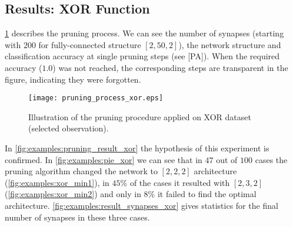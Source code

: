 \begin{table}[H]
\centering
{}
\caption{Experiment settings for XOR dataset.}
\label{tab:examples:xor_settings}
\end{table}

\subsection*{Results: XOR Function}
\cref{fig:examples:pruning_process_xor} describes the pruning process. We can see the number of synapses (starting with $ 200 $ for fully-connected structure $ [2, 50, 2] $), the network structure and classification accuracy at single pruning steps (see [PA]). When the required accuracy ($ 1.0 $) was not reached, the corresponding steps are transparent in the figure, indicating they were forgotten.

\begin{figure}[H]
\centering
\texttt{[image: pruning\_process\_xor.eps]}
\caption{Illustration of the pruning procedure applied on XOR dataset (selected observation).}
\label{fig:examples:pruning_process_xor}
\end{figure}

In \cref{fig:examples:pruning_result_xor} the hypothesis of this experiment is confirmed. In \cref{fig:examples:pie_xor} we can see that in $ 47 $ out of $ 100 $ cases the pruning algorithm changed the network to $ [2, 2, 2] $ architecture (\cref{fig:examples:xor_min1}), in $ 45\% $ of the cases it resulted with $ [2, 3, 2] $ (\cref{fig:examples:xor_min2}) and only in $ 8\% $ it failed to find the optimal architecture. \cref{fig:examples:result_synapses_xor} gives statistics for the final number of synapses in these three cases.


